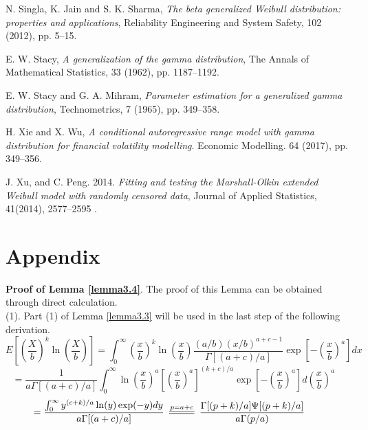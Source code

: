 \documentclass{ps}
\theoremstyle{plain}%
\theoremstyle{definition}
\theoremstyle{remark}
\newcommand{\longeq}{\scalebox{4}[1]{=}}   %
\begin{document}
\begin{thebibliography}{}
	
	N. Singla, K. Jain and S. K. Sharma,  \emph{The beta generalized Weibull distribution: properties and applications}, Reliability Engineering and System Safety, 102 (2012),  pp. 5--15.
	
	E. W. Stacy,   \emph{A generalization of the gamma distribution}, The Annals of Mathematical Statistics, 33 (1962), pp. 1187--1192.
	
	E. W. Stacy and G. A. Mihram,  \emph{Parameter estimation for a generalized gamma distribution}, Technometrics, 7 (1965),  pp. 349--358.
	
	H. Xie and  X. Wu, \emph{A conditional autoregressive range model with gamma distribution for financial volatility modelling}. Economic Modelling. 64 (2017), pp. 349--356.
	
	J. Xu,  and C. Peng. 2014. \emph{Fitting and testing the Marshall-Olkin extended Weibull model with randomly censored data}, Journal of Applied Statistics, 41(2014), 2577--2595 .
	
\end{thebibliography}



\section{Appendix}
\appendix
{\bf Proof of Lemma \ref{lemma3.4}}. The proof of this Lemma can be obtained through direct calculation.\\
(1). Part (1) of Lemma \ref{lemma3.3} will be used in the last step of the following derivation.
$$
E\left[\left(\frac{X}{b} \right)^k\ln\left(\frac{X}{b}\right) \right] = \int_0^\infty \left( \frac{x}{b}\right)^k\ln\left( \frac{x}{b}\right)\frac{(a/b)(x/b)^{a+c-1}}{\Gamma[(a+c)/a]}\exp\left[ -\left( \frac{x}{b}\right)^a\right]dx
$$ 
$$
=\frac{1}{a\Gamma[(a+c)/a]}\int_0^\infty \ln\left( \frac{x}{b}\right)^a \left[\left(\frac{x}{b}\right)^a\right]^{(k+c)/a}\exp\left[-\left( \frac{x}{b}\right)^a\right] d\left(\frac{x}{b}\right)^a \ \ \ \ \ 
$$
$$
=\frac{\int_0^\infty y^{(c+k)/a} \ln(y)\exp(-y)dy}{a\Gamma[(a+c)/a]}
\stackrel{p = a + c}{\longeq}\frac{\Gamma[(p+k)/a]\Psi[(p+k)/a]}{a\Gamma(p/a)} \hspace{7mm}
$$
\end{document}
